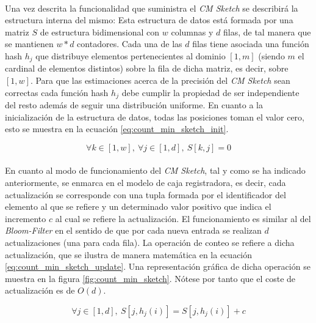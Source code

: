 \documentclass{subfiles}
\begin{document}
      \paragraph{}
      Una vez descrita la funcionalidad que suministra el \emph{CM Sketch} se describirá la estructura interna del mismo: Esta estructura de datos está formada por una matriz $S$ de estructura bidimensional con $w$ columnas y $d$ filas, de tal manera que se mantienen $w * d$ contadores. Cada una de las $d$ filas tiene asociada una función hash $h_j$ que distribuye elementos pertenecientes al dominio $[1, m]$ (siendo $m$ el cardinal de elementos distintos) sobre la fila de dicha matriz, es decir, sobre $[1,w]$. Para que las estimaciones acerca de la precisión del \emph{CM Sketch} sean correctas cada función hash $h_j$ debe cumplir la propiedad de ser independiente del resto además de seguir una distribución uniforme. En cuanto a la inicialización de la estructura de datos, todas las posiciones toman el valor cero, esto se muestra en la ecuación \eqref{eq:count_min_sketch_init}.

      \begin{equation}
      \label{eq:count_min_sketch_init}
        \forall k \in [1,w], \ \forall j \in [1,d], \ S[k,j] = 0
      \end{equation}


      \paragraph{}
      En cuanto al modo de funcionamiento del \emph{CM Sketch}, tal y como se ha indicado anteriormente, se enmarca en el modelo de caja registradora, es decir, cada actualización se corresponde con una tupla formada por el identificador del elemento al que se refiere y un determinado valor positivo que indica el incremento $c$ al cual se refiere la actualización. El funcionamiento es similar al del \emph{Bloom-Filter} en el sentido de que por cada nueva entrada se realizan $d$ actualizaciones (una para cada fila). La operación de conteo se refiere a dicha actualización, que se ilustra de manera matemática en la ecuación \eqref{eq:count_min_sketch_update}. Una representación gráfica de dicha operación se muestra en la figura \ref{fig:count_min_sketch}. Nótese por tanto que el coste de actualización es de $O(d)$.

      \begin{equation}
      \label{eq:count_min_sketch_update}
        \forall j \in [1,d], \ S[j, h_j(i)] = S[j, h_j(i)] + c
      \end{equation}
\end{document}
